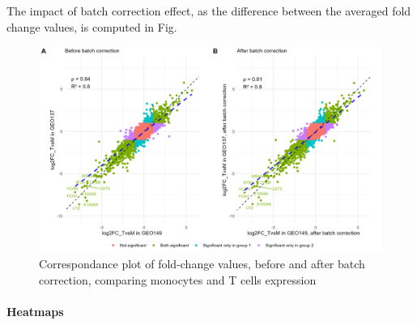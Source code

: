 \begin{Shaded}
\begin{Highlighting}
\SpecialCharTok{::}\OtherTok{\textless{}{-}}\SpecialCharTok{::}\SpecialCharTok{\%\textgreater{}\%}
\SpecialCharTok{::}\NormalTok{(} \NormalTok{)}
\OtherTok{\textless{}{-}}\SpecialCharTok{::}\NormalTok{(}
   \NormalTok{)}
\end{Highlighting}
\end{Shaded}

The impact of batch correction effect, as the difference between the averaged fold change values, is computed in Fig. 

\begin{figure}

{\centering \includegraphics[width=0.9\linewidth]{./figures/batch_effect_concord_plot} 

}

\caption{Correspondance plot of fold-change values, before and after batch correction, comparing monocytes and T cells expression}
\label{fig:concord-plot2}
\end{figure}


\paragraph{Heatmaps}
\label{heatmaps}

